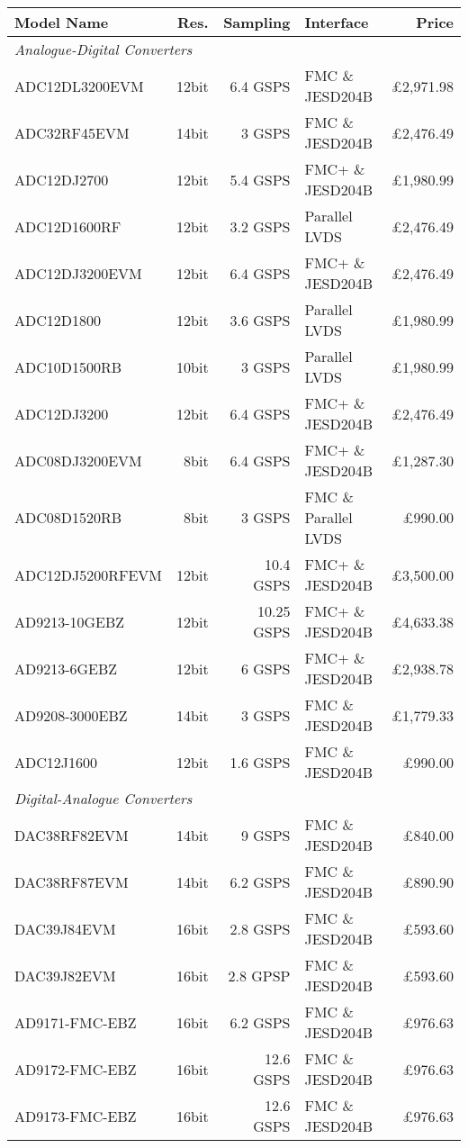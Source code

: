 \begin{table}[h]
	\centering
	\begin{tabularx}{1\textwidth}{l|r|r|l|r}
        \textbf{Model Name} & \textbf{Res.} & \textbf{Sampling} & \textbf{Interface} & \textbf{Price} \\ \hline
        \multicolumn{2}{l}{\textit{Analogue-Digital Converters}} \\ \hline
        ADC12DL3200EVM	& 12bit	& 6.4 GSPS &	FMC \& JESD204B	& £2,971.98 \\
        ADC32RF45EVM	& 14bit	& 3 GSPS &	FMC \& JESD204B	& £2,476.49 \\
        ADC12DJ2700	& 12bit	& 5.4 GSPS &	FMC+ \& JESD204B	& £1,980.99 \\
        ADC12D1600RF	& 12bit	& 3.2 GSPS &	Parallel LVDS 	& £2,476.49 \\
        ADC12DJ3200EVM	& 12bit	& 6.4 GSPS &	FMC+ \& JESD204B	& £2,476.49 \\
        ADC12D1800	& 12bit	& 3.6 GSPS &	Parallel LVDS 	& £1,980.99 \\
        ADC10D1500RB	& 10bit	& 3 GSPS &	Parallel LVDS 	& £1,980.99 \\
        ADC12DJ3200	& 12bit	& 6.4 GSPS &	FMC+ \& JESD204B	& £2,476.49 \\
        ADC08DJ3200EVM	& 8bit	& 6.4 GSPS &	FMC+ \& JESD204B	& £1,287.30 \\
        ADC08D1520RB	& 8bit	& 3 GSPS &	FMC \& Parallel LVDS 	& £990.00 \\
        ADC12DJ5200RFEVM	& 12bit	& 10.4 GSPS &	FMC+ \& JESD204B	& £3,500.00 \\
        AD9213-10GEBZ	& 12bit	& 10.25 GSPS &	FMC+ \& JESD204B	& £4,633.38 \\
        AD9213-6GEBZ 	& 12bit	& 6 GSPS &	FMC+ \& JESD204B	& £2,938.78 \\
        AD9208-3000EBZ 	& 14bit	& 3 GSPS &	FMC \& JESD204B	& £1,779.33 \\
        ADC12J1600	& 12bit	& 1.6 GSPS &	FMC \& JESD204B	& £990.00 \\ \hline
        \multicolumn{2}{l}{\textit{Digital-Analogue Converters}} \\ \hline
        DAC38RF82EVM	& 14bit &	9 GSPS	 & FMC \& JESD204B &	£840.00 \\
        DAC38RF87EVM	& 14bit &	6.2 GSPS & FMC \& JESD204B &	£890.90 \\
        DAC39J84EVM		& 16bit &	2.8 GSPS&	FMC \& JESD204B &	£593.60 \\
        DAC39J82EVM     & 16bit &   2.8 GPSP& FMC \& JESD204B & £593.60 \\
        AD9171-FMC-EBZ 	& 16bit &	6.2 GSPS&	FMC \& JESD204B &	£976.63 \\
        AD9172-FMC-EBZ  	& 16bit &	12.6 GSPS&	FMC \& JESD204B &	£976.63 \\
        AD9173-FMC-EBZ  	& 16bit &	12.6 GSPS&	FMC \& JESD204B &	£976.63 \\
    \end{tabularx}
\end{table}
